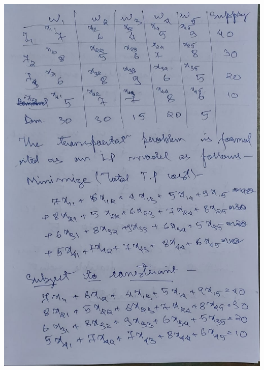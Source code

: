 \documentclass[12pt, letterpaper, twoside]{book}
\begin{document}
\includegraphics[width=\paperwidth, height=\paperheight]{Page2}
\end{document}
